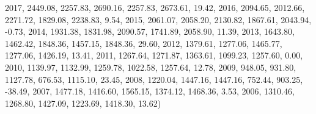 \documentclass[
  letterpaper,
]{book}
\newenvironment{Shaded}{\begin{snugshade}}{\end{snugshade}}
\newcommand{\DecValTok}[1]{\textcolor[rgb]{0.68,0.00,0.00}{#1}}
\newcommand{\FloatTok}[1]{\textcolor[rgb]{0.68,0.00,0.00}{#1}}
\newcommand{\NormalTok}[1]{\textcolor[rgb]{0.00,0.23,0.31}{#1}}
\newcommand{\SpecialCharTok}[1]{\textcolor[rgb]{0.37,0.37,0.37}{#1}}
\begin{document}
\begin{Shaded}
\begin{Highlighting}[]
  \DecValTok{2017}\NormalTok{, }\FloatTok{2449.08}\NormalTok{, }\FloatTok{2257.83}\NormalTok{, }\FloatTok{2690.16}\NormalTok{, }\FloatTok{2257.83}\NormalTok{, }\FloatTok{2673.61}\NormalTok{, }\FloatTok{19.42}\NormalTok{,}
  \DecValTok{2016}\NormalTok{, }\FloatTok{2094.65}\NormalTok{, }\FloatTok{2012.66}\NormalTok{, }\FloatTok{2271.72}\NormalTok{, }\FloatTok{1829.08}\NormalTok{, }\FloatTok{2238.83}\NormalTok{, }\FloatTok{9.54}\NormalTok{,}
  \DecValTok{2015}\NormalTok{, }\FloatTok{2061.07}\NormalTok{, }\FloatTok{2058.20}\NormalTok{, }\FloatTok{2130.82}\NormalTok{, }\FloatTok{1867.61}\NormalTok{, }\FloatTok{2043.94}\NormalTok{, }\SpecialCharTok{{-}}\FloatTok{0.73}\NormalTok{,}
  \DecValTok{2014}\NormalTok{, }\FloatTok{1931.38}\NormalTok{, }\FloatTok{1831.98}\NormalTok{, }\FloatTok{2090.57}\NormalTok{, }\FloatTok{1741.89}\NormalTok{, }\FloatTok{2058.90}\NormalTok{, }\FloatTok{11.39}\NormalTok{,}
  \DecValTok{2013}\NormalTok{, }\FloatTok{1643.80}\NormalTok{, }\FloatTok{1462.42}\NormalTok{, }\FloatTok{1848.36}\NormalTok{, }\FloatTok{1457.15}\NormalTok{, }\FloatTok{1848.36}\NormalTok{, }\FloatTok{29.60}\NormalTok{,}
  \DecValTok{2012}\NormalTok{, }\FloatTok{1379.61}\NormalTok{, }\FloatTok{1277.06}\NormalTok{, }\FloatTok{1465.77}\NormalTok{, }\FloatTok{1277.06}\NormalTok{, }\FloatTok{1426.19}\NormalTok{, }\FloatTok{13.41}\NormalTok{,}
  \DecValTok{2011}\NormalTok{, }\FloatTok{1267.64}\NormalTok{, }\FloatTok{1271.87}\NormalTok{, }\FloatTok{1363.61}\NormalTok{, }\FloatTok{1099.23}\NormalTok{, }\FloatTok{1257.60}\NormalTok{, }\FloatTok{0.00}\NormalTok{,}
  \DecValTok{2010}\NormalTok{, }\FloatTok{1139.97}\NormalTok{, }\FloatTok{1132.99}\NormalTok{, }\FloatTok{1259.78}\NormalTok{, }\FloatTok{1022.58}\NormalTok{, }\FloatTok{1257.64}\NormalTok{, }\FloatTok{12.78}\NormalTok{,}
  \DecValTok{2009}\NormalTok{, }\FloatTok{948.05}\NormalTok{, }\FloatTok{931.80}\NormalTok{, }\FloatTok{1127.78}\NormalTok{, }\FloatTok{676.53}\NormalTok{, }\FloatTok{1115.10}\NormalTok{, }\FloatTok{23.45}\NormalTok{,}
  \DecValTok{2008}\NormalTok{, }\FloatTok{1220.04}\NormalTok{, }\FloatTok{1447.16}\NormalTok{, }\FloatTok{1447.16}\NormalTok{, }\FloatTok{752.44}\NormalTok{, }\FloatTok{903.25}\NormalTok{, }\SpecialCharTok{{-}}\FloatTok{38.49}\NormalTok{,}
  \DecValTok{2007}\NormalTok{, }\FloatTok{1477.18}\NormalTok{, }\FloatTok{1416.60}\NormalTok{, }\FloatTok{1565.15}\NormalTok{, }\FloatTok{1374.12}\NormalTok{, }\FloatTok{1468.36}\NormalTok{, }\FloatTok{3.53}\NormalTok{,}
  \DecValTok{2006}\NormalTok{, }\FloatTok{1310.46}\NormalTok{, }\FloatTok{1268.80}\NormalTok{, }\FloatTok{1427.09}\NormalTok{, }\FloatTok{1223.69}\NormalTok{, }\FloatTok{1418.30}\NormalTok{, }\FloatTok{13.62}\NormalTok{)}
\end{Highlighting}
\end{Shaded}
\end{document}
